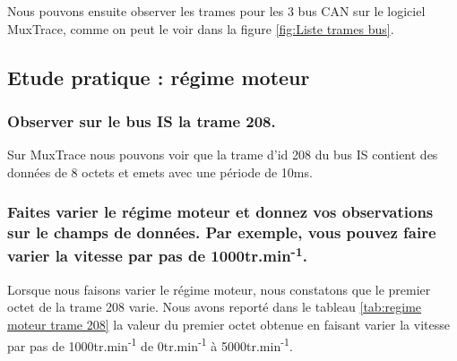 \documentclass{rapportECC}
\begin{document}

Nous pouvons ensuite observer les trames pour les 3 bus CAN sur le logiciel MuxTrace, comme on peut le voir dans la figure \ref{fig:Liste trames bus}.



\subsection{Etude pratique : régime moteur}

\subsubsection*{Observer sur le bus IS la trame 208.}

Sur MuxTrace nous pouvons voir que la trame d'id 208 du bus IS contient des données de 8 octets et emets avec une période de 10ms.

\subsubsection*{Faites varier le régime moteur et donnez vos observations sur le champs de données. Par exemple, vous pouvez faire varier la vitesse par pas de 1000tr.min\textsuperscript{-1}.}

Lorsque nous faisons varier le régime moteur, nous constatons que le premier octet de la trame 208 varie. Nous avons reporté dans le tableau \ref{tab:regime moteur trame 208} la valeur du premier octet obtenue en faisant varier la vitesse par pas de 1000tr.min\textsuperscript{-1} de 0tr.min\textsuperscript{-1} à 5000tr.min\textsuperscript{-1}.
\end{document}
